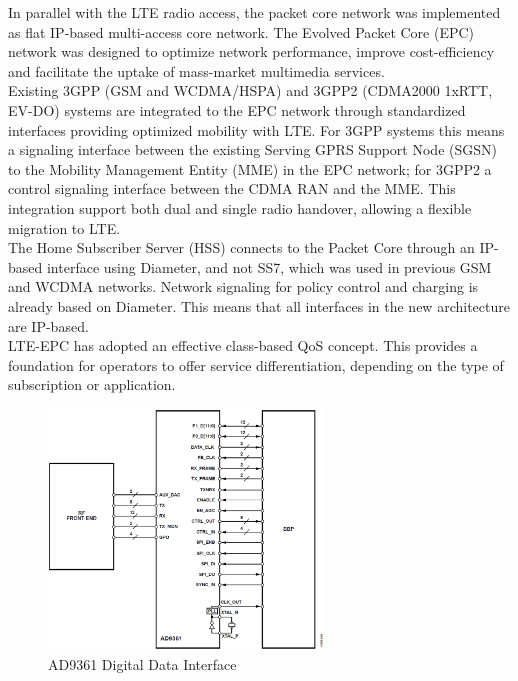 In parallel with the LTE radio access, the packet core network was implemented as
flat IP-based multi-access core network. The Evolved Packet Core (EPC) network was
designed to optimize network performance, improve cost-efficiency and facilitate
the uptake of mass-market multimedia services.\\

Existing 3GPP (GSM and WCDMA/HSPA) and 3GPP2 (CDMA2000 1xRTT, EV-DO) systems are
integrated to the EPC network through standardized interfaces providing optimized
mobility with LTE. For 3GPP systems this means a signaling interface between the
existing Serving GPRS Support Node (SGSN) to the Mobility Management Entity (MME)
in the EPC network; for 3GPP2 a control signaling interface between the CDMA RAN
and the MME. This integration support both dual and single radio handover, allowing
a flexible migration to LTE.\\

The Home Subscriber Server (HSS) connects to the Packet Core through an IP-based
interface using Diameter, and not SS7, which was used in previous GSM and WCDMA
networks. Network signaling for policy control and charging is already based on
Diameter. This means that all interfaces in the new architecture are IP-based.\\

LTE-EPC has adopted an effective class-based QoS concept. This provides a
foundation for operators to offer service differentiation, depending on the type
of subscription or application.

\begin{figure}[htbp]
    \centering
    \includegraphics[width=0.65\textwidth]{./figures/ad9361_digital_interface}
    \caption{ AD9361 Digital Data Interface
    \label{fig:ad9361diginterface}}
\end{figure}

